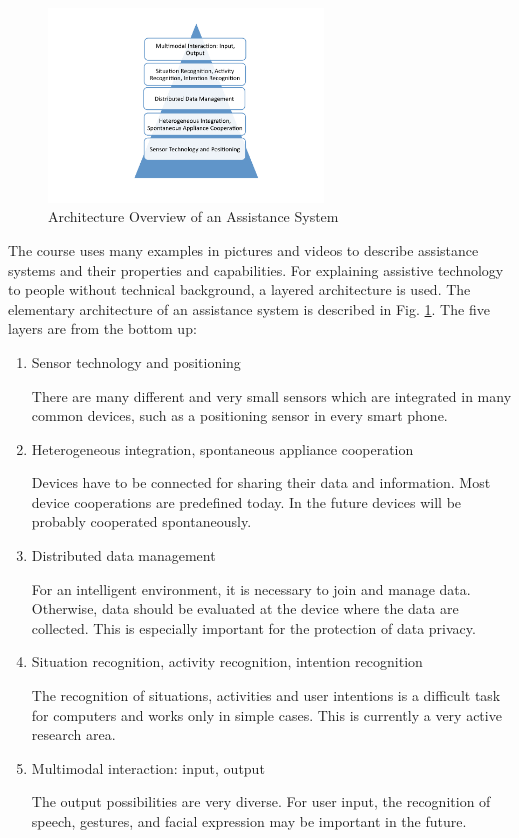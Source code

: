 \documentclass[runningheads,a4paper]{llncs}
\begin{document}
\begin{figure}[ht]
    \centering
        \includegraphics[width=0.65\textwidth]{figures/arch_aal.pdf}
    \caption{Architecture Overview of an Assistance System}
    \label{arch}
\end{figure}

The course uses many examples in pictures and videos to describe assistance systems and their properties and capabilities.
For explaining assistive technology to people without technical background, a layered architecture is used. The elementary architecture of an assistance system is described in Fig. \ref{arch}. The five layers are from the bottom up:
\begin{enumerate}
\item Sensor technology and positioning

There are many different and very small sensors which are integrated in many common devices, such as a positioning sensor in every smart phone.
\item Heterogeneous integration, spontaneous appliance cooperation

Devices have to be connected for sharing their data and information. Most device cooperations are predefined today. In the future devices will be probably cooperated spontaneously.
\item Distributed data management

For an intelligent environment, it is necessary to join and manage data. Otherwise, data should be evaluated at the device where the data are collected. This is especially important for the protection of data privacy.
\item Situation recognition, activity recognition, intention recognition

The recognition of situations, activities and user intentions is a difficult task for computers and works only in simple cases. This is currently a very active research area.
\item Multimodal interaction: input, output

The output possibilities are very diverse. For user input, the recognition of speech, gestures, and facial expression may be important in the future.
\end{enumerate}
\end{document}
